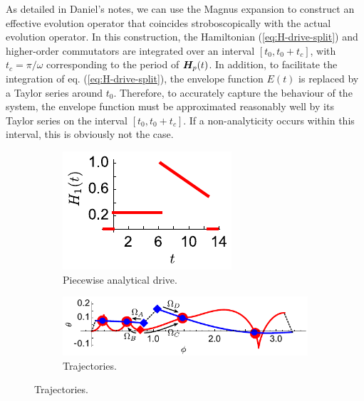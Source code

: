 As detailed in Daniel's notes, we can use the Magnus expansion to construct an effective evolution operator that coincides stroboscopically with the actual evolution operator. In this construction, the Hamiltonian (\ref{eq:H-drive-split}) and higher-order commutators are integrated over an interval $[t_0, t_0+t_c]$, with $t_c = \pi / \omega$ corresponding to the period of $\bm{H}_p(t)$. In addition, to facilitate the integration of eq. (\ref{eq:H-drive-split}), the envelope function $E(t)$ is replaced by a Taylor series around $t_0$. Therefore, to accurately capture the behaviour of the system, the envelope function must be approximated reasonably well by its Taylor series on the interval $[t_0, t_0+t_c]$. If a non-analyticity occurs within this interval, this is obviously not the case. 

\begin{figure}[tb]
	\centering
	\begin{subfigure}[b]{0.3\linewidth}
		\centering
		\includegraphics[scale=1]{figures/jumpop_drive_edited_v2.pdf}
		\caption{\label{fig:jumpop-trace:drive}Piecewise analytical drive.}
	\end{subfigure}%
	\begin{subfigure}[b]{0.7\linewidth}
		\centering
		\includegraphics[scale=1]{figures/jumpop_trace_edited_v2.pdf}
		\caption{\label{fig:jumpop-trace:trajectory}Trajectories.}
	\end{subfigure}%

\end{figure}

